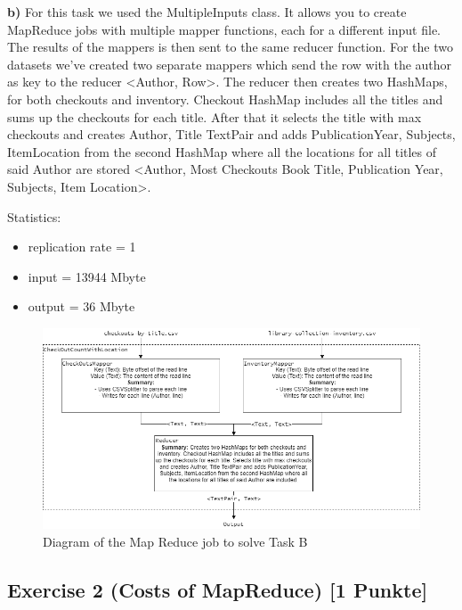 \documentclass[]{article}
\providecommand{\tightlist}{%
  \setlength{\itemsep}{0pt}\setlength{\parskip}{0pt}}
\begin{document}
\textbf{b)} For this task we used the MultipleInputs class. It allows
you to create MapReduce jobs with multiple mapper functions, each for a
different input file. The results of the mappers is then sent to the
same reducer function. For the two datasets we've created two separate
mappers which send the row with the author as key to the reducer
\textless{}Author, Row\textgreater{}. The reducer then creates two
HashMaps, for both checkouts and inventory. Checkout HashMap includes
all the titles and sums up the checkouts for each title. After that it
selects the title with max checkouts and creates Author, Title TextPair
and adds PublicationYear, Subjects, ItemLocation from the second HashMap
where all the locations for all titles of said Author are stored
\textless{}Author, Most Checkouts Book Title, Publication Year,
Subjects, Item Location\textgreater{}.

Statistics:

\begin{itemize}
\tightlist
\item
  replication rate = 1
\item
  input = 13944 Mbyte
\item
  output = 36 Mbyte
\end{itemize}

\begin{figure}[h]

{\centering \includegraphics[width=450px]{images/Exercise_1_Task_B} 

}

\caption{\label{fig:figs}Diagram of the Map Reduce job to solve Task B}\label{fig:unnamed-chunk-2}
\end{figure}

\newpage

\hypertarget{exercise-2-costs-of-mapreduce-1-punkte}{%
\subsection{Exercise 2 (Costs of MapReduce) {[}1
Punkte{]}}\label{exercise-2-costs-of-mapreduce-1-punkte}}
\end{document}
